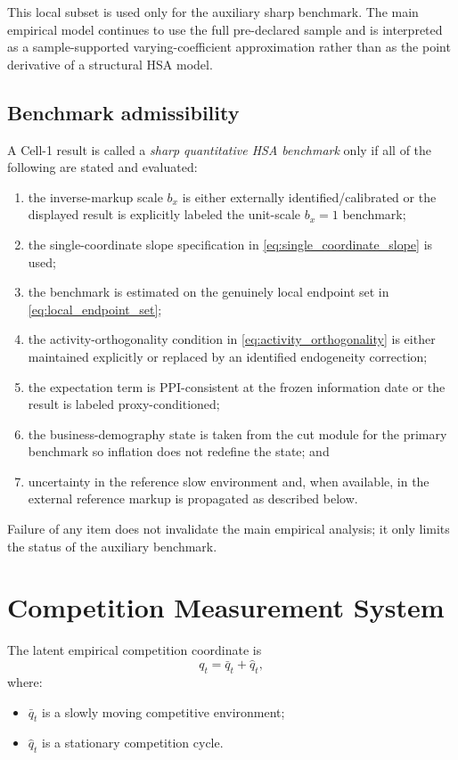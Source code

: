 \documentclass[11pt]{article}
\begin{document}
This local subset is used only for the auxiliary sharp benchmark. The main empirical model continues to use the full pre-declared sample and is interpreted as a sample-supported varying-coefficient approximation rather than as the point derivative of a structural HSA model.

\subsection*{Benchmark admissibility}
A Cell-1 result is called a \emph{sharp quantitative HSA benchmark} only if all of the following are stated and evaluated:
\begin{enumerate}
\item the inverse-markup scale $b_x$ is either externally identified/calibrated or the displayed result is explicitly labeled the unit-scale $b_x=1$ benchmark;
\item the single-coordinate slope specification in \cref{eq:single_coordinate_slope} is used;
\item the benchmark is estimated on the genuinely local endpoint set in \cref{eq:local_endpoint_set};
\item the activity-orthogonality condition in \cref{eq:activity_orthogonality} is either maintained explicitly or replaced by an identified endogeneity correction;
\item the expectation term is PPI-consistent at the frozen information date or the result is labeled proxy-conditioned;
\item the business-demography state is taken from the cut module for the primary benchmark so inflation does not redefine the state; and
\item uncertainty in the reference slow environment and, when available, in the external reference markup is propagated as described below.
\end{enumerate}
Failure of any item does not invalidate the main empirical analysis; it only limits the status of the auxiliary benchmark.

\section{Competition Measurement System}

The latent empirical competition coordinate is
\begin{equation}
q_t=\bar q_t+\hat q_t,
\label{eq:q_decomposition}
\end{equation}
where:
\begin{itemize}
\item \(\bar q_t\) is a slowly moving competitive environment;
\item \(\hat q_t\) is a stationary competition cycle.
\end{itemize}
\end{document}
